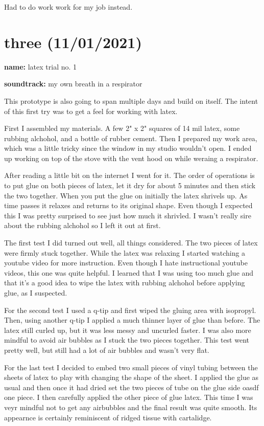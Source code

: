 \documentclass[11pt]{report}
\begin{document}
Had to do work work for my job instead.


\clearpage
\section*{three (11/01/2021)}
\textbf{name:} latex trial no. 1

\textbf{soundtrack:} my own breath in a respirator

This prototype is also going to span multiple days and build on itself. The intent of this first try was to get a feel for working with latex. 

First I assembled my materials. A few 2" x 2" squares of 14 mil latex, some rubbing alchohol, and a bottle of rubber cement. Then I prepared my work area, which was a little tricky since the window in my studio wouldn't open. I ended up working on top of the stove with the vent hood on while weraing a respirator.

After reading a little bit on the internet I went for it. The order of operations is to put glue on both pieces of latex, let it dry for about 5 minutes and then stick the two together. When you put the glue on initially the latex shrivels up. As time passes it relaxes and returns to its original shape. Even though I expected this I was pretty surprised to see just how much it shrivled. I wasn't really sire about the rubbing alchohol so I left it out at first. 

The first test I did turned out well, all things considered. The two pieces of latex were firmly stuck together. While the latex was relaxing I started watching a youtube video for more instruction. Even though I hate instructional youtube videos, this one was quite helpful. I learned that I was using too much glue and that it's a good idea to wipe the latex with rubbing alchohol before applying glue, as I suspected.

For the second test I used a q-tip and first wiped the gluing area with isopropyl. Then, using another q-tip I applied a much thinner layer of glue than before. The latex still curled up, but it was less messy and uncurled faster. I was also more mindful to avoid air bubbles as I stuck the two pieces together. This test went pretty well, but still had a lot of air bubbles and wasn't very flat.

For the last test I decided to embed two small pieces of vinyl tubing between the sheets of latex to play with changing the shape of the sheet. I applied the glue as usual and then once it had dried set the two pieces of tube on the glue side oasdf one piece. I then carefully applied the other piece of glue latex. This time I was veyr mindful not to get any airbubbles and the final result was quite smooth. Its appearnce is certainly reminiscent of ridged tissue with cartalidge.
\end{document}
